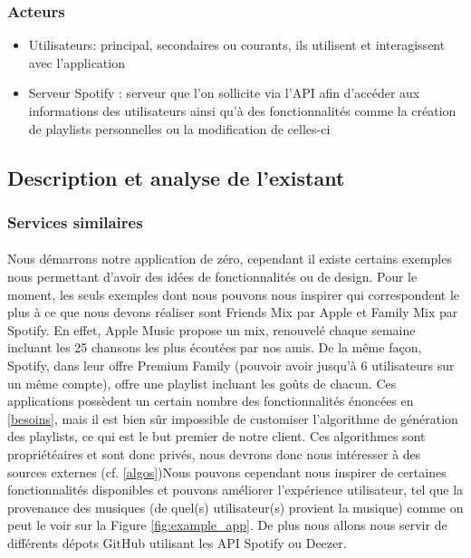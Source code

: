 \documentclass{article}
\begin{document}
		\subsubsection{Acteurs}
		\begin{itemize}
			\item Utilisateurs: principal, secondaires ou courants, ils utilisent et interagissent avec l'application
			\item Serveur Spotify : serveur que l'on sollicite via l'API afin d'accéder aux informations des utilisateurs ainsi qu'à des fonctionnalités comme la création de playlists personnelles ou la modification de celles-ci 
		\end{itemize}

		\subsection{Description et analyse de l'existant}
		\subsubsection{Services similaires}
		\paragraph{}
		Nous démarrons notre application de zéro, cependant il existe certains exemples nous permettant d'avoir des idées de fonctionnalités ou de design. Pour le moment, les seuls exemples dont nous pouvons nous inspirer qui correspondent le plus à ce que nous devons réaliser sont Friends Mix par Apple et Family Mix par Spotify. En effet, Apple Music propose un mix, renouvelé chaque semaine incluant les 25 chansons les plus écoutées par nos amis. De la même façon, Spotify, dans leur offre Premium Family (pouvoir avoir jusqu'à 6 utilisateurs sur un même compte), offre une playlist incluant les goûts de chacun. Ces applications possèdent un certain nombre des fonctionnalités énoncées en \ref{besoins}, mais il est bien sûr impossible de customiser l'algorithme de génération des playlists, ce qui est le but premier de notre client. Ces algorithmes sont propriétéaires et sont donc privés, nous devrons donc nous intéresser à des sources externes (cf. \ref{algos})Nous pouvons cependant nous inspirer de certaines fonctionnalités disponibles et pouvons améliorer l'expérience utilisateur, tel que la provenance des musiques (de quel(s) utilisateur(s) provient la musique) comme on peut le voir sur la Figure \ref{fig:example_app}.
		De plus nous allons nous servir de différents dépots GitHub utilisant les API Spotify \cite{spotify-web-api} ou Deezer.
								
\end{document}
